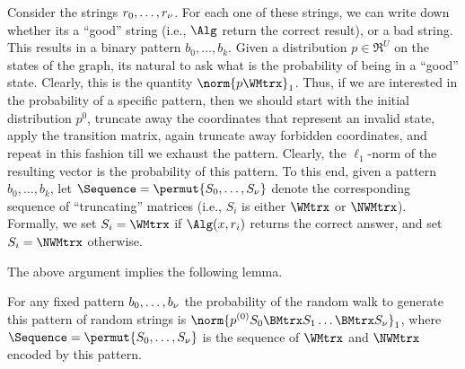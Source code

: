 Consider the strings $r_0, \ldots, r_\nu$. For each one of these
strings, we can write down whether its a ``good'' string (i.e., $\Alg$
return the correct result), or a bad string. This results in a binary
pattern $b_0, \ldots, b_k$. Given a distribution $p \in \Re^U$ on the
states of the graph, its natural to ask what is the probability of
being in a ``good'' state. Clearly, this is the quantity $\norm{p
   \WMtrx}_1$. Thus, if we are interested in the probability of a
specific pattern, then we should start with the initial distribution
$p^{0}$, truncate away the coordinates that represent an invalid
state, apply the transition matrix, again truncate away forbidden
coordinates, and repeat in this fashion till we exhaust the
pattern. Clearly, the $\ell_1$-norm of the resulting vector is the
probability of this pattern. To this end, given a pattern $b_0,\ldots,
b_k$, let $\Sequence = \permut{S_0, \ldots, S_\altK}$ denote the
corresponding sequence of ``truncating'' matrices (i.e., $S_i$ is
either $\WMtrx$ or $\NWMtrx$). Formally, we set $S_i=\WMtrx$ if
$\Alg(x, r_i)$ returns the correct answer, and set $S_i = \NWMtrx$
otherwise.

The above argument implies the following lemma.

\begin{lemma}
    For any fixed pattern $b_0, \ldots, b_\nu$ the probability of
    the random walk to generate this pattern of random strings is
    $\displaystyle \norm{\smash{p^{(0)} S_0 \BMtrx S_1 \ldots \BMtrx
          S_\altK}}_1$, where
    $\Sequence = \permut{S_0, \ldots, S_\altK}$ is the sequence of
    $\WMtrx$ and $\NWMtrx$ encoded by this pattern.
\end{lemma}


